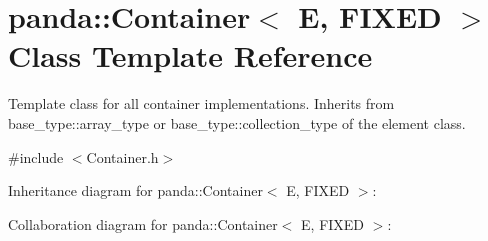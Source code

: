 \hypertarget{classpanda_1_1Container}{\section{panda\-:\-:Container$<$ E, F\-I\-X\-E\-D $>$ Class Template Reference}
\label{classpanda_1_1Container}
}


Template class for all container implementations. Inherits from base\-\_\-type\-::array\-\_\-type or base\-\_\-type\-::collection\-\_\-type of the element class.  




{\ttfamily \#include $<$Container.\-h$>$}



Inheritance diagram for panda\-:\-:Container$<$ E, F\-I\-X\-E\-D $>$\-:


Collaboration diagram for panda\-:\-:Container$<$ E, F\-I\-X\-E\-D $>$\-:
